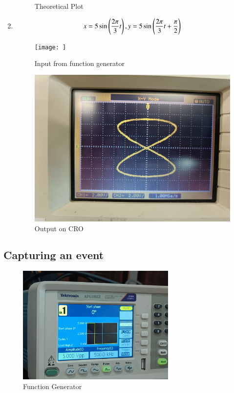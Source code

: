 \documentclass[journal]{IEEEtran}
\begin{document}
\begin{enumerate}
\begin{figure}[H]
        \caption{Theoretical Plot}
    \end{figure}
    \item \begin{align}
        x = 5\sin\left(\frac{2\pi}{3}t\right), y = 5\sin\left(\frac{2\pi}{3}t+\frac{\pi}{2}\right)
    \end{align}
    \begin{figure}[H]
        \centering
        \texttt{[image: ]}
        \caption{Input from function generator}
    \end{figure}
    \begin{figure}[H]
        \centering
        \includegraphics[width=0.7\columnwidth]{pics/WhatsApp Image 2025-01-23 at 13.22.02(1).jpeg}
        \caption{Output on CRO}
    \end{figure}
\end{enumerate}

\subsection{Capturing an event}
\begin{figure}[h]
    \centering
    \includegraphics[width=0.7\textwidth]{pics/WhatsApp Image 2025-01-23 at 13.22.08.jpeg}
    \caption{Function Generator}
\end{figure}
\end{document}
